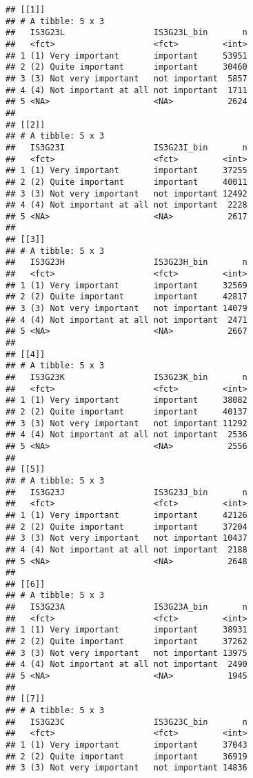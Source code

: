 \documentclass[]{article}
\begin{document}
\begin{verbatim}
## [[1]]
## # A tibble: 5 x 3
##   IS3G23L                  IS3G23L_bin       n
##   <fct>                    <fct>         <int>
## 1 (1) Very important       important     53951
## 2 (2) Quite important      important     30460
## 3 (3) Not very important   not important  5857
## 4 (4) Not important at all not important  1711
## 5 <NA>                     <NA>           2624
## 
## [[2]]
## # A tibble: 5 x 3
##   IS3G23I                  IS3G23I_bin       n
##   <fct>                    <fct>         <int>
## 1 (1) Very important       important     37255
## 2 (2) Quite important      important     40011
## 3 (3) Not very important   not important 12492
## 4 (4) Not important at all not important  2228
## 5 <NA>                     <NA>           2617
## 
## [[3]]
## # A tibble: 5 x 3
##   IS3G23H                  IS3G23H_bin       n
##   <fct>                    <fct>         <int>
## 1 (1) Very important       important     32569
## 2 (2) Quite important      important     42817
## 3 (3) Not very important   not important 14079
## 4 (4) Not important at all not important  2471
## 5 <NA>                     <NA>           2667
## 
## [[4]]
## # A tibble: 5 x 3
##   IS3G23K                  IS3G23K_bin       n
##   <fct>                    <fct>         <int>
## 1 (1) Very important       important     38082
## 2 (2) Quite important      important     40137
## 3 (3) Not very important   not important 11292
## 4 (4) Not important at all not important  2536
## 5 <NA>                     <NA>           2556
## 
## [[5]]
## # A tibble: 5 x 3
##   IS3G23J                  IS3G23J_bin       n
##   <fct>                    <fct>         <int>
## 1 (1) Very important       important     42126
## 2 (2) Quite important      important     37204
## 3 (3) Not very important   not important 10437
## 4 (4) Not important at all not important  2188
## 5 <NA>                     <NA>           2648
## 
## [[6]]
## # A tibble: 5 x 3
##   IS3G23A                  IS3G23A_bin       n
##   <fct>                    <fct>         <int>
## 1 (1) Very important       important     38931
## 2 (2) Quite important      important     37262
## 3 (3) Not very important   not important 13975
## 4 (4) Not important at all not important  2490
## 5 <NA>                     <NA>           1945
## 
## [[7]]
## # A tibble: 5 x 3
##   IS3G23C                  IS3G23C_bin       n
##   <fct>                    <fct>         <int>
## 1 (1) Very important       important     37043
## 2 (2) Quite important      important     36919
## 3 (3) Not very important   not important 14836

\end{verbatim}
\end{document}
